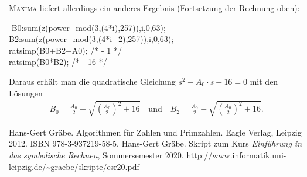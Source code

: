 \documentclass[11pt]{article}
\newcommand{\br}[1]{\ensuremath{\left(#1\right)}}
\def\pw{{\char94}}
\newenvironment{code}{\tt \begin{tabbing}
\hskip12pt\=\hskip12pt\=\hskip12pt\=\hskip12pt\=\hskip5cm\=\hskip5cm\=\kill}
{\end{tabbing}}
\begin{document}
\textsc{Maxima} liefert allerdings ein anderes Ergebnis (Fortsetzung der
Rechnung oben): 
\begin{code}
B0:sum(z\pw(power\_mod(3,(4*i),257)),i,0,63);\\
B2:sum(z\pw(power\_mod(3,(4*i+2),257)),i,0,63);\\
ratsimp(B0+B2+A0); /*  - 1 */\\
ratsimp(B0*B2);  /* - 16 */
\end{code}


Daraus erhält man die quadratische Gleichung $s^{2}- A_{0} \cdot s - 16 = 0$
mit den Lösungen
\begin{gather*}
  B_0 = \frac{A_0}{2}+ \sqrt{\br{\frac{A_0}{2}}^2+16}\quad\text{und}\quad B_2
  = \frac{A_0}{2}- \sqrt{\br{\frac{A_0}{2}}^2+16}.
\end{gather*}

\begin{thebibliography}{xxx}
 Hans-Gert Gräbe. Algorithmen für Zahlen und Primzahlen.
  Eagle Verlag, Leipzig 2012. ISBN 978-3-937219-58-5. 
 Hans-Gert Gräbe.  Skript zum Kurs \emph{Einführung in das
  symbolische Rechnen}, Sommersemester 2020.
  \url{http://www.informatik.uni-leipzig.de/~graebe/skripte/esr20.pdf}
\end{thebibliography}
\end{document}
